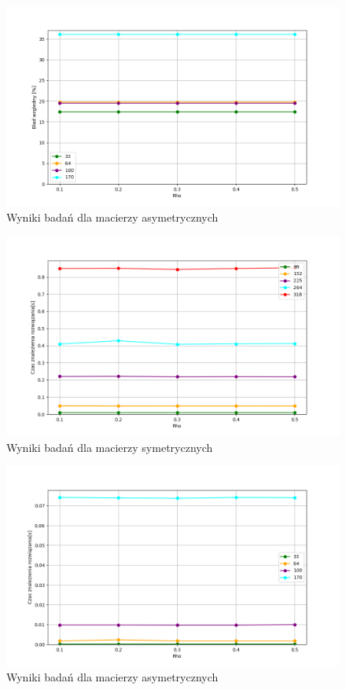 \documentclass{article}
\begin{document}
        \begin{figure}[ht]
          \centering
          \includegraphics[width=\textwidth]{src/plots/asymAoRho.png}
          \caption{Wyniki badań dla macierzy asymetrycznych}
          \label{fig:asymRho}
        \end{figure}
        \FloatBarrier
        
        \FloatBarrier
        \begin{figure}[ht]
          \centering
          \includegraphics[width=\textwidth]{src/plots/symAoRhoTime.png}
          \caption{Wyniki badań dla macierzy symetrycznych}
          \label{fig:symRhoT}
        \end{figure}
        \begin{figure}[ht]
          \centering
          \includegraphics[width=\textwidth]{src/plots/asymAoRhoTime.png}
          \caption{Wyniki badań dla macierzy asymetrycznych}
          \label{fig:asymRhoT}
        \end{figure}
\end{document}
